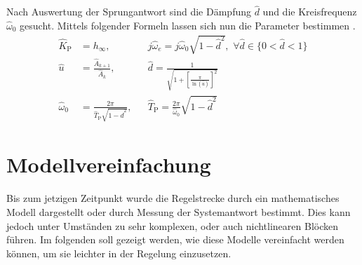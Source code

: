 %
Nach Auswertung der Sprungantwort sind die Dämpfung $\hat{d}$ und die Kreisfrequenz $\hat{\omega}_{0}$ gesucht. Mittels folgender Formeln lassen sich nun die Parameter bestimmen \cite{Foellinger94}.
%
\begin{equation*}
\begin{aligned}
%
\hat{K}_{\text{P}}&=h_{\infty}, \quad &&j\hat{\omega}_{e}=j\hat{\omega}_{0}\sqrt{1-\hat{d}^{2}},\,\,\forall \hat{d} \in \{0<\hat{d}<1\}\\
\hat{u}&=\frac{\hat{A}_{k+1}}{\hat{A}_{k}}, &&\hat{d}=\frac{1}{\sqrt{1 + \left[\frac{\pi}{\ln(\hat{u})}\right]^{2}}}\\
\hat{\omega}_{0}&=\frac{2\pi}{\hat{T}_{\text{P}}\sqrt{1 - \hat{d}^{2}}}, &&\hat{T}_{\text{P}}=\frac{2\pi}{\hat{\omega}_{0}}\sqrt{1 - \hat{d}^{2}}
%
\end{aligned}
\end{equation*}
%
\section{Modellvereinfachung}
%
Bis zum jetzigen Zeitpunkt wurde die Regelstrecke durch ein mathematisches Modell dargestellt oder durch Messung der Systemantwort bestimmt. Dies kann jedoch unter Umständen zu sehr komplexen, oder auch nichtlinearen Blöcken führen. Im folgenden soll gezeigt werden, wie diese Modelle vereinfacht werden können, um sie leichter in der Regelung einzusetzen.
%
